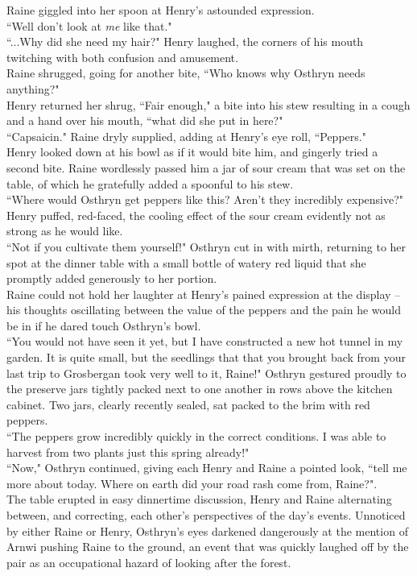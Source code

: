 Raine giggled into her spoon at Henry's astounded expression.\\
``Well don't look at \textit{me} like that."\\
``...Why did she need my hair?" Henry laughed, the corners of his mouth twitching with both confusion and amusement.\\
Raine shrugged, going for another bite, ``Who knows why Osthryn needs anything?"\\
Henry returned her shrug, ``Fair enough," a bite into his stew resulting in a cough and a hand over his mouth, ``what did she put in here?"\\
``Capsaicin." Raine dryly supplied, adding at Henry's eye roll, ``Peppers."\\
Henry looked down at his bowl as if it would bite him, and gingerly tried a second bite.
Raine wordlessly passed him a jar of sour cream that was set on the table, of which he gratefully added a spoonful to his stew.\\
``Where would Osthryn get peppers like this? Aren't they incredibly expensive?" Henry puffed, red-faced, the cooling effect of the sour cream evidently not as strong as he would like.\\

``Not if you cultivate them yourself!" Osthryn cut in with mirth, returning to her spot at the dinner table with a small bottle of watery red liquid that she promptly added generously to her portion.\\
Raine could not hold her laughter at Henry's pained expression at the display -- his thoughts oscillating between the value of the peppers and the pain he would be in if he dared touch Osthryn's bowl.\\
``You would not have seen it yet, but I have constructed a new hot tunnel in my garden. 
It is quite small, but the seedlings that that you brought back from your last trip to Grosbergan took very well to it, Raine!" Osthryn gestured proudly to the preserve jars tightly packed next to one another in rows above the kitchen cabinet. 
Two jars, clearly recently sealed, sat packed to the brim with red peppers.\\
``The peppers grow incredibly quickly in the correct conditions. I was able to harvest from two plants just this spring already!"\\

``Now," Osthryn continued, giving each Henry and Raine a pointed look, ``tell me more about today. Where on earth did your road rash come from, Raine?".\\   
The table erupted in easy dinnertime discussion, Henry and Raine alternating between, and correcting, each other's perspectives of the day's events.
Unnoticed by either Raine or Henry, Osthryn's eyes darkened dangerously at the mention of Arnwi pushing Raine to the ground, an event that was quickly laughed off by the pair as an occupational hazard of looking after the forest.\\

